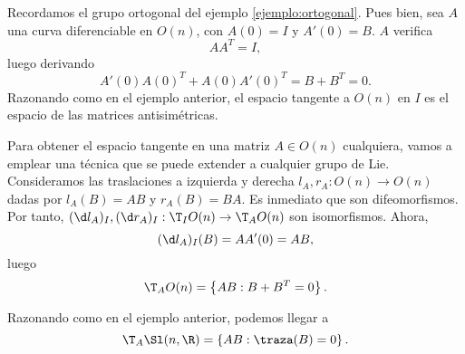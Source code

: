 \begin{ejemplo}
  Recordamos el grupo ortogonal del ejemplo \ref{ejemplo:ortogonal}. Pues bien,
  sea $A$ una curva diferenciable en $O(n)$, con $A(0) = I$ y $A'(0)=B$. $A$
  verifica
  \[
    AA^{T} = I
  ,\]
luego derivando
\[
  A'(0)A(0)^{T}+A(0)A'(0)^{T} = B+B^{T} = 0
.\]
Razonando como en el ejemplo anterior, el espacio tangente a $O(n)$ en $I$ es el
espacio de las matrices antisimétricas.

Para obtener el espacio tangente en una matriz $A\in O(n)$ cualquiera, vamos a
emplear una técnica que se puede extender a cualquier grupo de Lie. Consideramos
las traslaciones a izquierda y derecha $l_{A},r_{A}: O(n)\to O(n)$ dadas por
$l_{A}(B) = AB$ y $r_{A}(B) = BA$. Es inmediato que son difeomorfismos. Por
tanto, $(\d l_{A})_{I}, (\d r_{A})_{I}: \T_{I}O(n)\to \T_{A}O(n)$ son isomorfismos.
Ahora,
\[
  (\d l_{A})_{I}(B) = AA'(0) = AB
,\]
luego
\[
  \T_{A}O(n) = \left\{ AB : B+B^{T} = 0 \right\}
.\]
\end{ejemplo}

\begin{ejemplo}
  Razonando como en el ejemplo anterior, podemos llegar a
  \[
    \T_{A}\Sl(n,\R) = \left\{ AB : \traza(B) = 0 \right\}
  .\]
\end{ejemplo}

